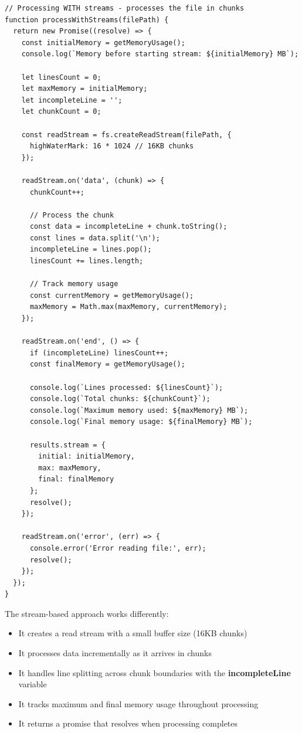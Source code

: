 \documentclass[12pt,letterpaper]{article}
\newenvironment{macterminal}{%
    \begin{mdframed}[
        linecolor=terminalFrame,
        backgroundcolor=terminalBg,
        roundcorner=5pt,
        skipabove=5pt,
        skipbelow=5pt,
        linewidth=1pt,
        innertopmargin=5pt,
        frametitle={%
            \tikz[baseline=(current bounding box.east), outer sep=0pt]{
                \fill[red!80!black] (0,0) circle (5pt);
                \fill[yellow!80!black] (0.7,0) circle (5pt);
                \fill[green!70!black] (1.4,0) circle (5pt);
            }
        },
        frametitlealignment=\raggedright,
        frametitleaboveskip=8pt,
        frametitlebelowskip=0pt,
    ]
}{%
    \end{mdframed}%
}
\begin{document}
\begin{macterminal}
\begin{lstlisting}
// Processing WITH streams - processes the file in chunks
function processWithStreams(filePath) {
  return new Promise((resolve) => {
    const initialMemory = getMemoryUsage();
    console.log(`Memory before starting stream: ${initialMemory} MB`);
    
    let linesCount = 0;
    let maxMemory = initialMemory;
    let incompleteLine = '';
    let chunkCount = 0;
    
    const readStream = fs.createReadStream(filePath, {
      highWaterMark: 16 * 1024 // 16KB chunks
    });
    
    readStream.on('data', (chunk) => {
      chunkCount++;
      
      // Process the chunk
      const data = incompleteLine + chunk.toString();
      const lines = data.split('\n');
      incompleteLine = lines.pop();
      linesCount += lines.length;
      
      // Track memory usage
      const currentMemory = getMemoryUsage();
      maxMemory = Math.max(maxMemory, currentMemory);
    });
    
    readStream.on('end', () => {
      if (incompleteLine) linesCount++;
      const finalMemory = getMemoryUsage();
      
      console.log(`Lines processed: ${linesCount}`);
      console.log(`Total chunks: ${chunkCount}`);
      console.log(`Maximum memory used: ${maxMemory} MB`);
      console.log(`Final memory usage: ${finalMemory} MB`);
      
      results.stream = { 
        initial: initialMemory,
        max: maxMemory, 
        final: finalMemory 
      };
      resolve();
    });

    readStream.on('error', (err) => {
      console.error('Error reading file:', err);
      resolve();
    });
  });
}
\end{lstlisting}
\end{macterminal}

The stream-based approach works differently:
\begin{itemize}
    \item It creates a read stream with a small buffer size (16KB chunks)
    \item It processes data incrementally as it arrives in chunks
    \item It handles line splitting across chunk boundaries with the \textbf{\textcolor{accentColor}{incompleteLine}} variable
    \item It tracks maximum and final memory usage throughout processing
    \item It returns a promise that resolves when processing completes
\end{itemize}
\end{document}
